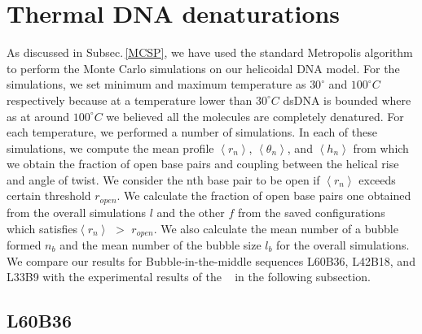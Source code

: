\documentclass[12pt,masters,final]{UTRGVthesis}
\begin{document}
\section{Thermal DNA denaturations}
As discussed in Subsec.\,\ref{MCSP}, we have used the standard Metropolis algorithm to perform the Monte Carlo simulations on our helicoidal DNA model. For the simulations, we set minimum and maximum temperature as $30^\circ$  and $100^\circ C$ respectively because at a temperature lower than $30^\circ C$ dsDNA is bounded where as at around $100^\circ C$ we believed all the molecules are completely denatured. For each temperature, we performed a number of simulations. In each of these simulations, we compute the mean profile $\left< r_{n} \right>$, $\left< \theta_{n} \right>$, and $\left< h_{n}\right>$ from which we obtain the fraction of open base pairs and coupling between the helical rise and angle of twist. We consider  the nth base pair to be open if $\left< r_{n} \right>$ exceeds certain threshold $r_{open}$. We calculate the fraction of open base pairs one obtained from the overall simulations $l$ and the other $f$ from the saved configurations which satisfies$\left< r_{n} \right>$ $>$ $r_{open}$. We also calculate the mean number of a bubble formed $n_{b}$ and the mean number of the bubble size $l_b$ for the overall simulations. We compare our results for Bubble-in-the-middle sequences L60B36, L42B18, and L33B9 with the experimental results of the ~\cite{zeng2003length,zeng2004bubble} in the following subsection.
\newpage
\subsection{L60B36}
\end{document}
